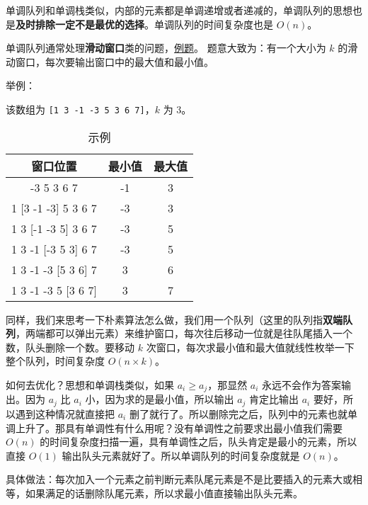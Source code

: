 

单调队列和单调栈类似，内部的元素都是单调递增或者递减的，单调队列的思想也是\textbf{及时排除一定不是最优的选择}。单调队列的时间复杂度也是 $O(n)$。

单调队列通常处理\textbf{滑动窗口}类的问题，\href{http://poj.org/problem?id=2823}{例题}。
题意大致为：有一个大小为 $k$ 的滑动窗口，每次要输出窗口中的最大值和最小值。

举例：

该数组为 \verb`[1 3 -1 -3 5 3 6 7]`，$k$ 为 $3$。

\begin{table}[ht]
\centering
\caption{示例}\label{tab_Mqueue_1}
\begin{tabular}{|c|c|c|}
\hline
窗口位置	 & 最小值	 & 最大值 \\
\hline
[1 3 -1] -3 5 3 6 7	 & -1 & 3 \\
\hline
1 [3 -1 -3] 5 3 6 7	 & -3 & 3 \\
\hline
1 3 [-1 -3 5] 3 6 7	 & -3 & 5 \\
\hline
1 3 -1 [-3 5 3] 6 7	 & -3 & 5 \\
\hline
1 3 -1 -3 [5 3 6] 7	 & 3 & 6 \\
\hline
1 3 -1 -3 5 [3 6 7]	 & 3 & 7 \\
\hline
\end{tabular}
\end{table}

同样，我们来思考一下朴素算法怎么做，我们用一个队列（这里的队列指\textbf{双端队列}，两端都可以弹出元素）来维护窗口，每次往后移动一位就是往队尾插入一个数，队头删除一个数。要移动 $k$ 次窗口，每次求最小值和最大值就线性枚举一下整个队列，时间复杂度 $O(n\times k)$。

如何去优化？思想和单调栈类似，如果 $a_i \geqslant a_j$，那显然 $a_i$ 永远不会作为答案输出。因为 $a_j$ 比 $a_i$ 小，因为求的是最小值，所以输出 $a_j$ 肯定比输出 $a_i$ 要好，所以遇到这种情况就直接把 $a_i$ 删了就行了。所以删除完之后，队列中的元素也就单调上升了。那具有单调性有什么用呢？没有单调性之前要求出最小值我们需要 $O(n)$ 的时间复杂度扫描一遍，具有单调性之后，队头肯定是最小的元素，所以直接 $O(1)$ 输出队头元素就好了。所以单调队列的时间复杂度就是 $O(n)$。

具体做法：每次加入一个元素之前判断元素队尾元素是不是比要插入的元素大或相等，如果满足的话删除队尾元素，所以求最小值直接输出队头元素。

